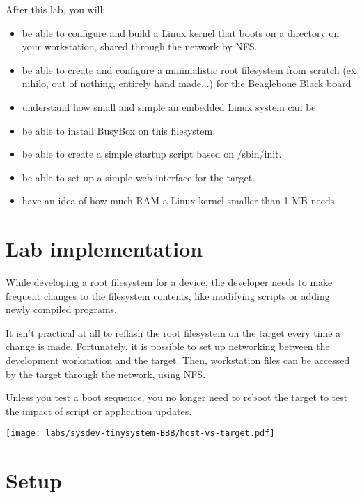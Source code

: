 
After this lab, you will:
\begin{itemize}
\item be able to configure and build a Linux kernel that boots on a
  directory on your workstation, shared through the network by NFS.
\item be able to create and configure a minimalistic root filesystem
  from scratch (ex nihilo, out of nothing, entirely hand made...) for
  the Beaglebone Black board
\item understand how small and simple an embedded Linux system can be.
\item be able to install BusyBox on this filesystem.
\item be able to create a simple startup script based on /sbin/init.
\item be able to set up a simple web interface for the target.
\item have an idea of how much RAM a Linux kernel smaller than 1 MB needs.
\end{itemize}

\section{Lab implementation}

While developing a root filesystem for a device, the developer needs
to make frequent changes to the filesystem contents, like modifying
scripts or adding newly compiled programs.

It isn't practical at all to reflash the root filesystem on the target
every time a change is made. Fortunately, it is possible to set up
networking between the development workstation and the target. Then,
workstation files can be accessed by the target through the network,
using NFS.

Unless you test a boot sequence, you no longer need to reboot the
target to test the impact of script or application updates.

\begin{center}
\texttt{[image: labs/sysdev-tinysystem-BBB/host-vs-target.pdf]}
\end{center}
\clearpage
\section{Setup}

